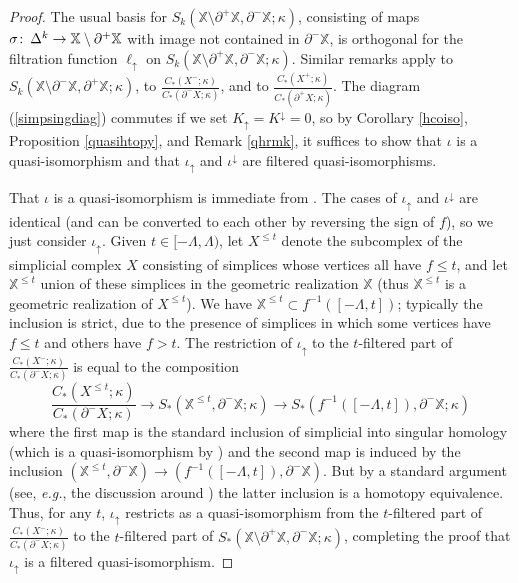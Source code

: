 \documentclass[11pt]{amsart}
\theoremstyle{definition}
\theoremstyle{remark}
\numberwithin{equation}{section}
\def\co{\colon\thinspace}
\begin{document}
\begin{proof}
	The usual basis for $S_k(\mathbb{X}\setminus\partial^+\mathbb{X},\partial^-\mathbb{X};\kappa)$, consisting of maps $\sigma\co\Delta^k\to \mathbb{X}\setminus\partial^+\mathbb{X}$ with image not contained in $\partial^-\mathbb{X}$, is orthogonal for the filtration function $\ell_{\uparrow}$ on $S_k(\mathbb{X}\setminus\partial^+\mathbb{X},\partial^-\mathbb{X};\kappa)$.  Similar remarks apply to  $S_k(\mathbb{X}\setminus\partial^-\mathbb{X},\partial^+\mathbb{X};\kappa)$, to $
	\frac{C_*(X^-;\kappa)}{C_*(\partial^-X;\kappa)}$, and to $\frac{C_*(X^+;\kappa)}{C_*(\partial^+X;\kappa)}$.	The diagram (\ref{simpsingdiag}) commutes if we set $K_{\uparrow}=K^{\downarrow}=0$, so by Corollary \ref{hcoiso}, Proposition \ref{quasihtopy}, and Remark \ref{qhrmk}, it suffices to show that $\iota$ is a quasi-isomorphism and that $\iota_{\uparrow}$ and $\iota^{\downarrow}$ are filtered quasi-isomorphisms.
	
	That $\iota$ is a quasi-isomorphism is immediate from \cite[Theorem 2.27]{Ha}. The cases of $\iota_{\uparrow}$ and $\iota^{\downarrow}$ are identical (and can be converted to each other by reversing the sign of $f$), so we just consider $\iota_{\uparrow}$.  Given $t\in [-\Lambda,\Lambda)$, let $X^{\leq t}$ denote the subcomplex of the simplicial complex $X$ consisting of simplices whose vertices all have $f\leq t$, and let $\mathbb{X}^{\leq t}$ union of these simplices in the geometric realization $\mathbb{X}$ (thus $\mathbb{X}^{\leq t}$ is a geometric realization of $X^{\leq t}$).  We have $\mathbb{X}^{\leq t}\subset f^{-1}([-\Lambda,t])$; typically the inclusion is strict, due to the presence of simplices in which some vertices have $f\leq t$ and others have $f>t$.  The restriction of $\iota_{\uparrow}$ to the $t$-filtered part of 
	$\frac{C_*(X^-;\kappa)}{C_*(\partial^-X;\kappa)}$ is equal to the composition \[ \frac{C_*(X^{\leq t};\kappa)}{C_*(\partial^-X;\kappa)}\to S_*(\mathbb{X}^{\leq t},\partial^-\mathbb{X};\kappa)\to S_*(f^{-1}([-\Lambda ,t]),\partial^-\mathbb{X};\kappa) \] where the first map is the standard inclusion of simplicial into singular homology (which is a quasi-isomorphism by \cite[Theorem 2.27]{Ha}) and the second map is induced by the inclusion $(\mathbb{X}^{\leq t},\partial^-\mathbb{X})\to (f^{-1}([-\Lambda,t]),\partial^-\mathbb{X})$. But by a standard argument (see, \emph{e.g.}, the discussion around \cite[Figure VI.8]{EH}) the latter inclusion is a homotopy equivalence.  Thus, for any $t$, $\iota_{\uparrow}$ restricts as a quasi-isomorphism from the $t$-filtered part of   $\frac{C_*(X^-;\kappa)}{C_*(\partial^-X;\kappa)}$ to the $t$-filtered part of $S_*(\mathbb{X}\setminus\partial^+\mathbb{X},\partial^-\mathbb{X};\kappa)$, completing the proof that $\iota_{\uparrow}$ is a filtered quasi-isomorphism.
\end{proof}
\end{document}
